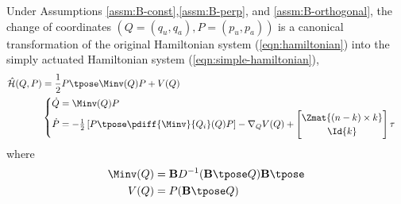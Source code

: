 \begin{thm}
    Under Assumptions \ref{assm:B-const},\ref{assm:B-perp}, and
    \ref{assm:B-orthogonal}, the change of coordinates 
    \((Q = (q_u, q_a), P = (p_u,p_a))\) 
    is a canonical transformation of the
    original Hamiltonian system (\ref{eqn:hamiltonian}) into
    the simply actuated Hamiltonian system (\ref{eqn:simple-hamiltonian}),
    \begin{align}\label{eqn:simple-hamiltonian}
        \hat{\mathcal{H}}(Q,P) &= 
        \frac{1}{2} P\tpose \Minv(Q) P + V(Q) \\
       &\begin{cases}
            \dot{Q} = \Minv(Q)P \\
            \dot{P} = -\frac{1}{2}
                \left[P\tpose \pdiff{\Minv}{Q_i}(Q) P \right] 
                - \nabla_Q V(Q) + 
                \begin{bmatrix}
                    \Zmat{(n-k)\times k} \\
                    \Id{k} \\
                \end{bmatrix} \tau
        \end{cases} \nonumber
    \end{align}
    where
    \begin{align*}
        \Minv(Q) &= \mathbf{B}D^{-1}(\mathbf{B}\tpose Q)\mathbf{B}\tpose \\
        V(Q) &= P(\mathbf{B}\tpose Q) \\
    \end{align*}
\end{thm}
